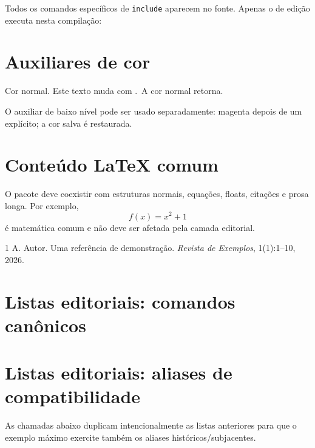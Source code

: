 \documentclass[11pt]{article}
\begin{document}
Todos os comandos específicos de \texttt{include} aparecem no fonte. Apenas
o de edição executa nesta compilação:


\section{Auxiliares de cor}

Cor normal. Este texto muda com
\texttt{\string\cwcolor}.\cwrestorecolor\ A cor normal retorna.

O auxiliar de baixo nível pode ser usado separadamente:
\cwsavecolor
\color{magenta}magenta depois de um \texttt{\string\color} explícito;
\cwrestorecolor
a cor salva é restaurada.

\section{Conteúdo LaTeX comum}

O pacote deve coexistir com estruturas normais, equações, floats, citações e
prosa longa. Por exemplo,
\[
  f(x)=x^2+1
\]
é matemática comum e não deve ser afetada pela camada editorial.

\lipsum[2]

\begin{thebibliography}{1}
A. Autor.
\newblock Uma referência de demonstração.
\newblock \emph{Revista de Exemplos}, 1(1):1--10, 2026.
\end{thebibliography}

\clearpage
\section*{Listas editoriais: comandos canônicos}

\listofcomments
\listofcitationneeds
\listofsubjects

\clearpage
\section*{Listas editoriais: aliases de compatibilidade}

As chamadas abaixo duplicam intencionalmente as listas anteriores para que
o exemplo máximo exercite também os aliases históricos/subjacentes.

\listofcomentario
\listofcomentarioref
\listofsubject
\listofassunto
\end{document}

